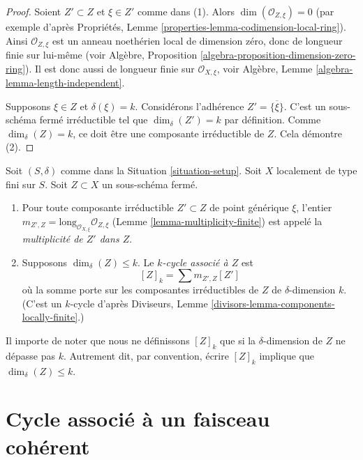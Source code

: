 \begin{proof}
Soient $Z' \subset Z$ et $\xi \in Z'$ comme dans (1).
Alors $\dim(\mathcal{O}_{Z, \xi}) = 0$ (par exemple d'après
Propriétés, Lemme \ref{properties-lemma-codimension-local-ring}).
Ainsi $\mathcal{O}_{Z, \xi}$ est un anneau noethérien
local de dimension zéro, donc de longueur finie sur
lui-même (voir
Algèbre, Proposition \ref{algebra-proposition-dimension-zero-ring}).
Il est donc aussi de longueur finie sur $\mathcal{O}_{X, \xi}$, voir
Algèbre, Lemme \ref{algebra-lemma-length-independent}.

\medskip\noindent
Supposons $\xi \in Z$ et $\delta(\xi) = k$.
Considérons l'adhérence $Z' = \overline{\{\xi\}}$. C'est un sous-schéma
fermé irréductible tel que $\dim_\delta(Z') = k$ par définition.
Comme $\dim_\delta(Z) = k$, ce doit être une composante irréductible
de $Z$. Cela démontre (2).
\end{proof}

\begin{definition}
\label{definition-cycle-associated-to-closed-subscheme}
Soit $(S, \delta)$ comme dans la Situation \ref{situation-setup}.
Soit $X$ localement de type fini sur $S$.
Soit $Z \subset X$ un sous-schéma fermé.
\begin{enumerate}
\item Pour toute composante irréductible $Z' \subset Z$ de point générique $\xi$,
l'entier
$m_{Z', Z} = \text{long}_{\mathcal{O}_{X, \xi}} \mathcal{O}_{Z, \xi}$
(Lemme \ref{lemma-multiplicity-finite})
est appelé la {\it multiplicité de $Z'$ dans $Z$}.
\item Supposons $\dim_\delta(Z) \leq k$.
Le {\it $k$-cycle associé à $Z$} est
$$
[Z]_k
=
\sum m_{Z', Z}[Z']
$$
où la somme porte sur les composantes irréductibles de $Z$
de $\delta$-dimension $k$. (C'est un $k$-cycle d'après
Diviseurs, Lemme \ref{divisors-lemma-components-locally-finite}.)
\end{enumerate}
\end{definition}

\noindent
Il importe de noter que nous ne définissons $[Z]_k$ que si la $\delta$-dimension
de $Z$ ne dépasse pas $k$. Autrement dit, par convention, écrire
$[Z]_k$ implique que $\dim_\delta(Z) \leq k$.



\section{Cycle associé à un faisceau cohérent}
\label{section-cycle-of-coherent-sheaf}



